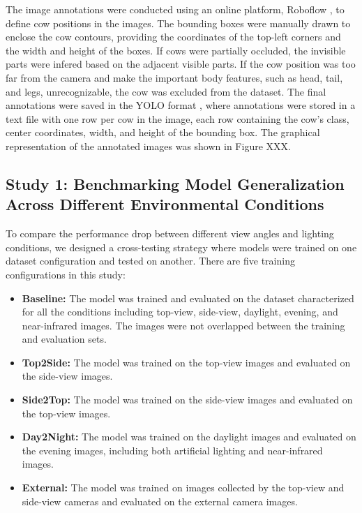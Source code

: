 The image annotations were conducted using an online platform, Roboflow \citep{}, to define cow positions in the images. The bounding boxes were manually drawn to enclose the cow contours, providing the coordinates of the top-left corners and the width and height of the boxes. If cows were partially occluded, the invisible parts were infered based on the adjacent visible parts. If the cow position was too far from the camera and make the important body features, such as head, tail, and legs, unrecognizable, the cow was excluded from the dataset. The final annotations were saved in the YOLO format \citep{}, where annotations were stored in a text file with one row per cow in the image, each row containing the cow's class, center coordinates, width, and height of the bounding box. The graphical representation of the annotated images was shown in Figure XXX.

\subsection*{Study 1: Benchmarking Model Generalization Across Different Environmental Conditions}

To compare the performance drop between different view angles and lighting conditions, we designed a cross-testing strategy where models were trained on one dataset configuration and tested on another. There are five training configurations in this study:

\begin{itemize}
    \item \textbf{Baseline:} The model was trained and evaluated on the dataset characterized for all the conditions including top-view, side-view, daylight, evening, and near-infrared images. The images were not overlapped between the training and evaluation sets.
    \item \textbf{Top2Side:} The model was trained on the top-view images and evaluated on the side-view images.
    \item \textbf{Side2Top:} The model was trained on the side-view images and evaluated on the top-view images.
    \item \textbf{Day2Night:} The model was trained on the daylight images and evaluated on the evening images, including both artificial lighting and near-infrared images.
    \item \textbf{External:} The model was trained on images collected by the top-view and side-view cameras and evaluated on the external camera images.
\end{itemize}

